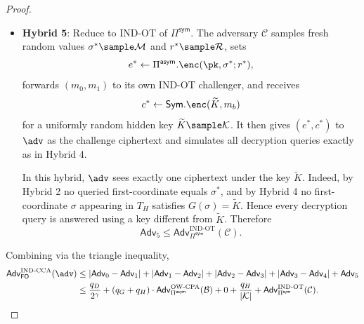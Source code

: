 \begin{proof}
\begin{itemize}
        \item \textbf{Hybrid 5}: Reduce to IND-OT of $\Pi^{\mathsf{sym}}$. The adversary $\mathcal{C}$ samples fresh random values $\sigma^* \sample \mathcal{M}$ and $r^* \sample \mathcal{R}$, sets
              \[
                  e^* \gets \Pi^{\mathsf{asym}}.\enc(\pk, \sigma^*; r^*),
              \]
              forwards $(m_0, m_1)$ to its own IND-OT challenger, and receives
              \[
                  c^* \gets \mathsf{Sym}.\enc(\widetilde{K}, m_b)
              \]
              for a uniformly random hidden key $\widetilde{K} \sample \mathcal{K}$. It then gives $(e^*, c^*)$ to $\adv$ as the challenge ciphertext and simulates all decryption queries exactly as in Hybrid 4.

              In this hybrid, $\adv$ sees exactly one ciphertext under the key $\widetilde{K}$. Indeed, by Hybrid 2 no queried first-coordinate equals $\sigma^*$, and by Hybrid 4 no first-coordinate $\sigma$ appearing in $T_H$ satisfies $G(\sigma) = \widetilde{K}$. Hence every decryption query is answered using a key different from $\widetilde{K}$. Therefore
              \[
                  \mathsf{Adv}_5 \leq \mathsf{Adv}^{\text{IND-OT}}_{\Pi^{\mathsf{sym}}}(\mathcal{C}).
              \]
    \end{itemize}

    Combining via the triangle inequality,
    \begin{align*}
        \mathsf{Adv}^{\text{IND-CCA}}_{\mathsf{FO}}(\adv)
         & \leq |\mathsf{Adv}_0 - \mathsf{Adv}_1|
           + |\mathsf{Adv}_1 - \mathsf{Adv}_2|
           + |\mathsf{Adv}_2 - \mathsf{Adv}_3|
           + |\mathsf{Adv}_3 - \mathsf{Adv}_4|
           + \mathsf{Adv}_5 \\
         & \leq
           \frac{q_D}{2^\gamma}
           + (q_G + q_H)\cdot \mathsf{Adv}^{\text{OW-CPA}}_{\Pi^{\mathsf{asym}}}(\advb)
           + 0
           + \frac{q_H}{|\mathcal{K}|}
           + \mathsf{Adv}^{\text{IND-OT}}_{\Pi^{\mathsf{sym}}}(\mathcal{C}).
    \end{align*}
\end{proof}

